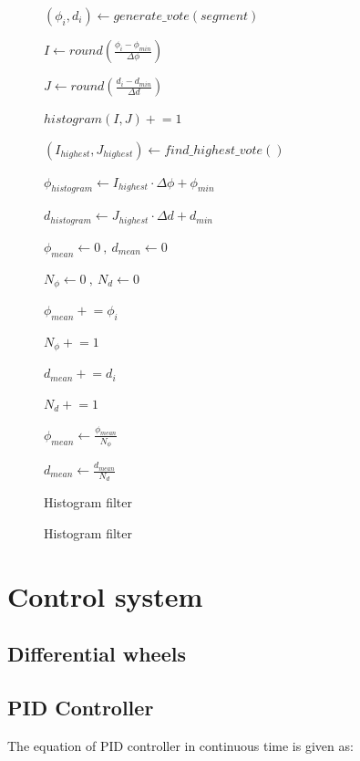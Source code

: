 \documentclass{article}
\begin{document}
\begin{figure} [ht]
\begin{algorithm}[H]
	 {
			$(\phi_i, d_i) \gets generate\_vote(segment)$
			
			$I \gets round(\frac{\phi_i - \phi_{min}}{\Delta\phi})$

			$J \gets round(\frac{d_i - d_{min}}{\Delta d})$
			
			$histogram(I, J) \mathrel{+}= 1$
	}
	
	$(I_{highest}, J_{highest}) \gets find \_ highest \_ vote()$	
	
	$\phi_{histogram} \gets I_{highest} \cdot \Delta \phi + \phi_{min}$
	
	$d_{histogram} \gets J_{highest} \cdot \Delta d + d_{min}$

	$\phi_{mean} \gets 0 \ , \  d_{mean} \gets 0$
	
	$N_{\phi} \gets 0 \ , \ N_{d} \gets 0$
	
	{
		{
			$\phi_{mean} \mathrel{+}= \phi_{i}$
			
			$N_{\phi} \mathrel{+}= 1$
		}
		
		{
			$d_{mean} \mathrel{+}= d_{i}$
			
			$N_{d} \mathrel{+}= 1$
		}
	}
	
	$\phi_{mean} \gets \frac{\phi_{mean}}{N_{\phi}}$
	
	$d_{mean} \gets \frac{d_{mean}}{N_{d}}$	
	\caption{Histogram filter}
\end{algorithm}
\caption{Histogram filter}
\end{figure}
\FloatBarrier

\clearpage

\section{Control system}

\subsection{Differential wheels}

\subsection{PID Controller}
The equation of PID controller in continuous time is given as:\\
\end{document}
